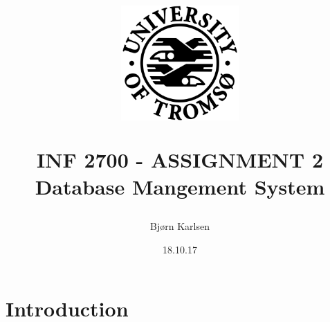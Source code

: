 \documentclass[11pt]{article}
\title{\begin{figure}[h!]
 \centering
  \includegraphics[width=0.4\textwidth]{uit.png}\linebreak[2.0]
 \end{figure}\textbf{INF 2700 - ASSIGNMENT 2\linebreak[2.0]\\Database Mangement System}}
\author{Bjørn Karlsen}
\date{18.10.17}
\begin{document}
\maketitle

\section{Introduction}
\end{document}
